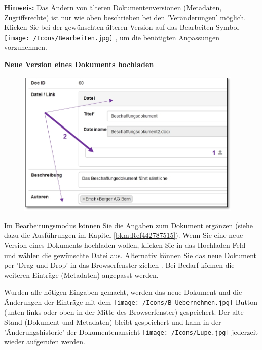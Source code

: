 \vspace{\baselineskip}

\textbf{Hinweis:} Das Ändern von älteren Dokumentenversionen (Metadaten, Zugriffsrechte) ist nur wie oben beschrieben bei den 'Veränderungen' möglich. Klicken Sie bei der gewünschten älteren Version auf das Bearbeiten-Symbol \texttt{[image: /Icons/Bearbeiten.jpg]} , um die benötigten Anpassungen vorzunehmen.

\pagebreak

\textbf{Neue Version eines Dokuments hochladen}

\vspace{\baselineskip}

\begin{figure}
\vspace{-10pt}
\includegraphics[height=70mm]{../chapters/11_Dokumentenablage/pictures/11-2-5_NeuesDokuHochladen.jpg}
\end{figure}
Im Bearbeitungsmodus können Sie die Angaben zum Dokument ergänzen (siehe dazu die Ausführungen im Kapitel \ref{bkm:Ref442787515}). Wenn Sie eine neue Version eines Dokuments hochladen wollen, klicken Sie in das Hochladen-Feld  und wählen die gewünschte Datei aus. Alternativ können Sie das neue Dokument per 'Drag und Drop' in das Browserfenster ziehen . Bei Bedarf können die weiteren Einträge (Metadaten) angepasst werden.

\vspace{\baselineskip}

Wurden alle nötigen Eingaben gemacht, werden das neue Dokument und die Änderungen der Einträge mit dem \texttt{[image: /Icons/B\_Uebernehmen.jpg]}-Button (unten links oder oben in der Mitte des Browserfenster) gespeichert. Der alte Stand (Dokument und Metadaten) bleibt gespeichert und kann in der 'Änderungshistorie' der Dokumentenansicht \texttt{[image: /Icons/Lupe.jpg]} jederzeit wieder aufgerufen werden.

